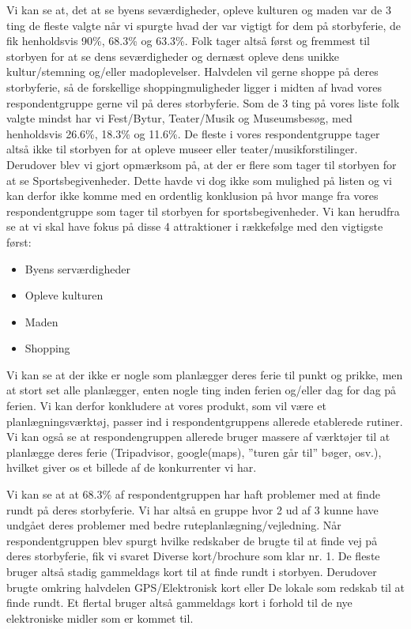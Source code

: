 Vi kan se  at, det at se byens seværdigheder, opleve kulturen og maden var de 3 ting de fleste valgte når vi spurgte hvad der var vigtigt for dem på storbyferie, de fik henholdsvis 90\%,  68.3\% og 63.3\%. Folk tager altså først og fremmest til storbyen for at se dens seværdigheder og dernæst opleve dens unikke kultur/stemning og/eller madoplevelser. Halvdelen vil gerne shoppe på deres storbyferie, så de forskellige shoppingmuligheder ligger i midten af hvad vores respondentgruppe gerne vil på deres storbyferie. Som de 3 ting på vores liste folk valgte mindst har vi Fest/Bytur, Teater/Musik og Museumsbesøg, med henholdsvis 26.6\%, 18.3\% og 11.6\%. De fleste i vores respondentgruppe tager altså ikke til storbyen for at opleve museer eller teater/musikforstilinger. Derudover blev vi gjort opmærksom på, at der er flere som tager til storbyen for at se Sportsbegivenheder. Dette havde vi dog ikke som mulighed på listen og vi kan derfor ikke komme med en ordentlig konklusion på hvor mange fra vores respondentgruppe som tager til storbyen for sportsbegivenheder.
Vi kan herudfra se at vi skal have fokus på disse 4 attraktioner i rækkefølge med den vigtigste først:

\begin{itemize}
	\item Byens serværdigheder
	\item Opleve kulturen
	\item Maden
	\item Shopping
\end{itemize}

Vi kan se at der ikke er nogle som planlægger deres ferie til punkt og prikke, men at stort set alle planlægger, enten nogle ting inden ferien og/eller dag for dag på ferien. Vi kan derfor konkludere at vores produkt, som vil være et planlægningsværktøj, passer ind i respondentgruppens allerede etablerede rutiner.
Vi kan også se at respondengruppen allerede bruger massere af værktøjer til at planlægge deres ferie (Tripadvisor, google(maps), ”turen går til” bøger, osv.), hvilket giver os et billede af de konkurrenter vi har.

Vi kan se at at 68.3\% af respondentgruppen har haft problemer med at finde rundt på deres storbyferie. Vi har altså en gruppe hvor 2 ud af 3 kunne have undgået deres problemer med bedre ruteplanlægning/vejledning.
Når respondentgruppen blev spurgt hvilke redskaber de brugte til at finde vej på deres storbyferie, fik vi svaret Diverse kort/brochure som klar nr. 1. De fleste bruger altså stadig gammeldags kort til at finde rundt i storbyen. Derudover brugte omkring halvdelen GPS/Elektronisk kort eller De lokale som redskab til at finde rundt. Et flertal bruger altså gammeldags kort i forhold til de nye elektroniske midler som er kommet til. 

